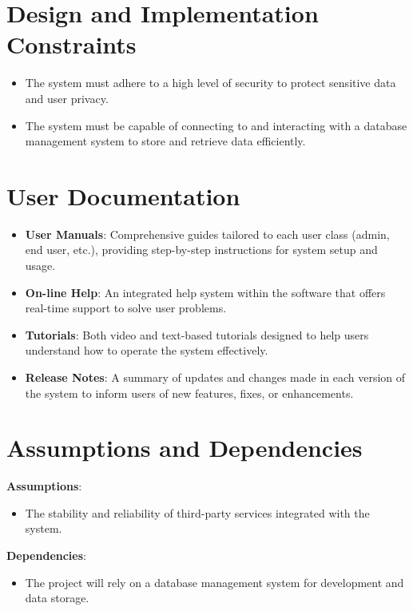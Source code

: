 \section{Design and Implementation Constraints}
\begin{itemize}
    \item The system must adhere to a high level of security to protect sensitive data and user privacy.
    \item The system must be capable of connecting to and interacting with a database management system to store and retrieve data efficiently.
\end{itemize}

\section{User Documentation}
\begin{itemize}
    \item \textbf{User Manuals}: Comprehensive guides tailored to each user class (admin, end user, etc.), providing step-by-step instructions for system setup and usage.
    \item \textbf{On-line Help}: An integrated help system within the software that offers real-time support to solve user problems.
    \item \textbf{Tutorials}: Both video and text-based tutorials designed to help users understand how to operate the system effectively.
    \item \textbf{Release Notes}: A summary of updates and changes made in each version of the system to inform users of new features, fixes, or enhancements.
\end{itemize}

\section{Assumptions and Dependencies}

\textbf{Assumptions}:
\begin{itemize}
    \item The stability and reliability of third-party services integrated with the system.
\end{itemize}

\textbf{Dependencies}:
\begin{itemize}
    \item The project will rely on a database management system for development and data storage.
\end{itemize}

